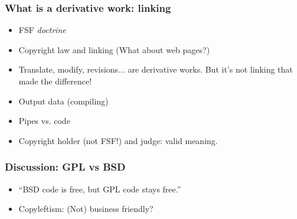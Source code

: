 
\begin{frame}
\frametitle{What is a derivative work: linking}

\begin{itemize}
\item FSF \textit{doctrine}
\item Copyright law and linking (What about web pages?)
\item Translate, modify, revisions... are derivative works. But it's not linking that made the difference!
\item Output data (compiling)
\item Pipes vs. code
\item Copyright holder (not FSF!) and judge: valid meaning. 
\end{itemize}
\end{frame}



\begin{frame}
\frametitle{Discussion: GPL vs BSD}

\begin{itemize}
\item ``BSD code is free, but GPL code stays free.'' 

\pause

\item Copyleftism: (Not) business friendly? 

\end{itemize}
\end{frame}





